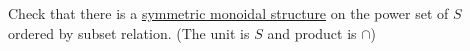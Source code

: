 Check that there is a \href{doc/1 math/Seven Sketches in Compositionality/Chapter 2: Resource theories/2 Symmetric monoidal preorders/1 Definition and first examples/1 Symmetric monoidal structure on a preorder}{symmetric monoidal structure} on the power set of $S$ ordered by subset relation. (The unit is $S$ and product is $\cap$)
